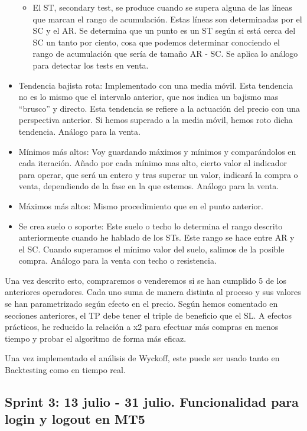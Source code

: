 \begin{itemize}
\begin{itemize}
		\item El ST, secondary test, se produce cuando se supera alguna de las líneas que marcan el rango de acumulación. Estas líneas son determinadas por el SC y el AR. Se determina que un punto es un ST según si está cerca del SC un tanto por ciento, cosa que podemos determinar conociendo el rango de acumulación que sería de tamaño AR - SC. Se aplica lo análogo para detectar los tests en venta.
	\end{itemize}
	\item Tendencia bajista rota: Implementado con una media móvil. Esta tendencia no es lo mismo que el intervalo anterior, que nos indica un bajismo mas “brusco” y directo. Esta tendencia se refiere a la actuación del precio con una perspectiva anterior. Si hemos superado a la media móvil, hemos roto dicha tendencia. Análogo para la venta.
	\item Mínimos más altos: Voy guardando máximos y mínimos y comparándolos en cada iteración. Añado por cada mínimo mas alto, cierto valor al indicador para operar, que será un entero y tras superar un valor, indicará la compra o venta, dependiendo de la fase en la que estemos. Análogo para la venta.
	\item Máximos más altos: Mismo procedimiento que en el punto anterior.
	\item Se crea suelo o soporte: Este suelo o techo lo determina el rango descrito anteriormente cuando he hablado de los STs. Este rango se hace entre AR y el SC. Cuando superamos el mínimo valor del suelo, salimos de la posible compra. Análogo para la venta con techo o resistencia.
\end{itemize}

Una vez descrito esto, compraremos o venderemos si se han cumplido 5 de los anteriores operadores. Cada uno suma de manera distinta al proceso y sus valores se han parametrizado según efecto en el precio. Según hemos comentado en secciones anteriores, el TP debe tener el triple de beneficio que el SL. A efectos prácticos, he reducido la relación a x2 para efectuar más compras en menos tiempo y probar el algoritmo de forma más eficaz. \newline

Una vez implementado el análisis de Wyckoff, este puede ser usado tanto en Backtesting como en tiempo real.\newline

\subsection{Sprint 3: 13 julio - 31 julio. Funcionalidad para login y logout en MT5}

